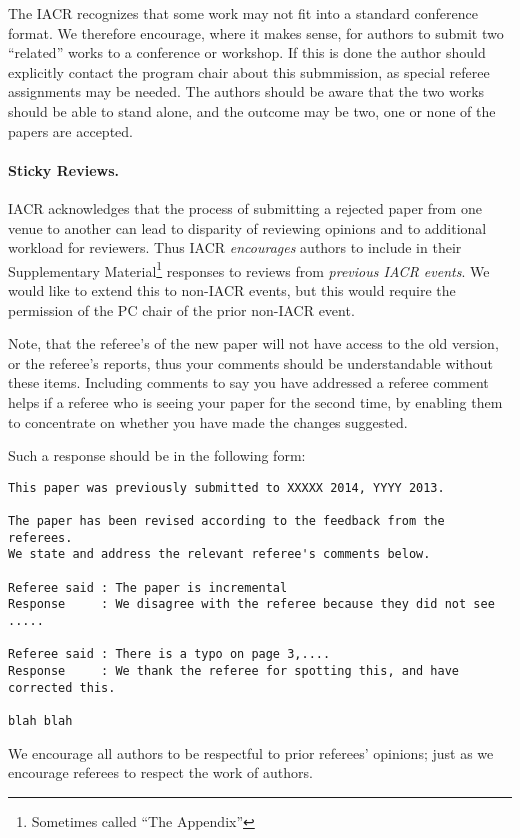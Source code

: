 \documentclass[11pt]{article}
\begin{document}
The IACR recognizes that some work may not fit into a standard
conference format. We therefore encourage, where it makes sense,
for authors to submit two ``related'' works to a conference or workshop.
If this is done the author should explicitly contact the program
chair about this submmission, as special referee assignments may be
needed.
The authors should be aware that the two works should be able to
stand alone, and the outcome may be two, one or none of the papers
are accepted.

\paragraph{Sticky Reviews.}
IACR acknowledges that the process of submitting a rejected paper
from one venue to another can lead to disparity of reviewing
opinions and to additional workload for reviewers. Thus IACR
\emph{encourages} authors to include in their Supplementary 
Material\footnote{Sometimes called ``The Appendix''} responses
to reviews from \emph{previous IACR events}. We would like to
extend this to non-IACR events, but this would require the 
permission of the PC chair of the prior non-IACR event.

Note, that the referee's of the new paper will not have access to the
old version, or the referee's reports, thus your comments should be
understandable without these items.
Including comments to say you have addressed a referee comment helps
if a referee who is seeing your paper for the second time, by enabling
them to concentrate on whether you have made the changes suggested.

Such a response should be in the following form:
\begin{verbatim}
This paper was previously submitted to XXXXX 2014, YYYY 2013.

The paper has been revised according to the feedback from the referees. 
We state and address the relevant referee's comments below.

Referee said : The paper is incremental
Response     : We disagree with the referee because they did not see .....

Referee said : There is a typo on page 3,....
Response     : We thank the referee for spotting this, and have corrected this.

blah blah
\end{verbatim}
We encourage all authors to be respectful to prior referees' opinions;
just as we encourage referees to respect the work of authors.
\end{document}
